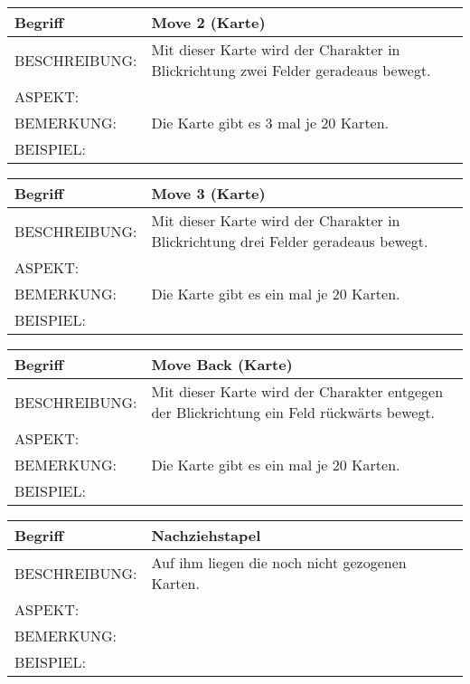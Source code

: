\documentclass{uulm-assignment}
\begin{document}
	     \begin{tabularx}{\textwidth}{|l|X |} \hline
	        \textbf{Begriff} & \textbf{Move 2 (Karte)} \\
	        \hline
	        BESCHREIBUNG: & Mit dieser Karte wird der Charakter in Blickrichtung zwei Felder geradeaus bewegt. \\
	        \hline
	        ASPEKT: &
	        \\
	        \hline
	        BEMERKUNG: & Die Karte gibt es 3 mal je 20 Karten. \\
	        \hline
	        BEISPIEL: & \\
	        \hline
	    \end{tabularx}

	     \begin{tabularx}{\textwidth}{|l|X |} \hline
	        \textbf{Begriff} & \textbf{Move 3 (Karte)} \\
	        \hline
	        BESCHREIBUNG: & Mit dieser Karte wird der Charakter in Blickrichtung drei Felder geradeaus bewegt. \\
	        \hline
	        ASPEKT: &
	        \\
	        \hline
	        BEMERKUNG: & Die Karte gibt es ein mal je 20 Karten. \\
	        \hline
	        BEISPIEL: & \\
	        \hline
	    \end{tabularx}

	    \begin{tabularx}{\textwidth}{|l|X |} \hline
	        \textbf{Begriff} & \textbf{Move Back (Karte)} \\
	        \hline
	        BESCHREIBUNG: & Mit dieser Karte wird der Charakter entgegen der Blickrichtung ein Feld rückwärts bewegt. \\
	        \hline
	        ASPEKT: &
	        \\
	        \hline
	        BEMERKUNG: & Die Karte gibt es ein mal je 20 Karten. \\
	        \hline
	        BEISPIEL: & \\
	        \hline
	    \end{tabularx}

	     \begin{tabularx}{\textwidth}{|l|X |} \hline
	        \textbf{Begriff} & \textbf{Nachziehstapel} \\
	        \hline
	        BESCHREIBUNG: & Auf ihm liegen die noch nicht gezogenen Karten. \\
	        \hline
	        ASPEKT: &
	        \\
	        \hline
	        BEMERKUNG: &  \\
	        \hline
	        BEISPIEL: & \\
	        \hline
	    \end{tabularx}
\end{document}
